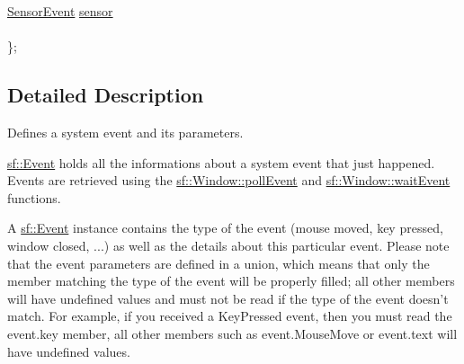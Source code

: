\begin{DoxyCompactItemize}
\begin{tabbing}
\>\hyperlink{structsf_1_1_event_1_1_sensor_event}{SensorEvent} \hyperlink{classsf_1_1_event_acdeacbb321655b962e27d08eeec5a190}{sensor}\\
\>\\
\}; \\

\end{tabbing}\end{DoxyCompactItemize}


\subsection{Detailed Description}
Defines a system event and its parameters. 

\hyperlink{classsf_1_1_event}{sf\-::\-Event} holds all the informations about a system event that just happened. Events are retrieved using the \hyperlink{classsf_1_1_window_a338e996585faf82e93069858e3b531b7}{sf\-::\-Window\-::poll\-Event} and \hyperlink{classsf_1_1_window_aaf02ab64fbc1d374eef3696df54137bc}{sf\-::\-Window\-::wait\-Event} functions.

A \hyperlink{classsf_1_1_event}{sf\-::\-Event} instance contains the type of the event (mouse moved, key pressed, window closed, ...) as well as the details about this particular event. Please note that the event parameters are defined in a union, which means that only the member matching the type of the event will be properly filled; all other members will have undefined values and must not be read if the type of the event doesn't match. For example, if you received a Key\-Pressed event, then you must read the event.\-key member, all other members such as event.\-Mouse\-Move or event.\-text will have undefined values.

